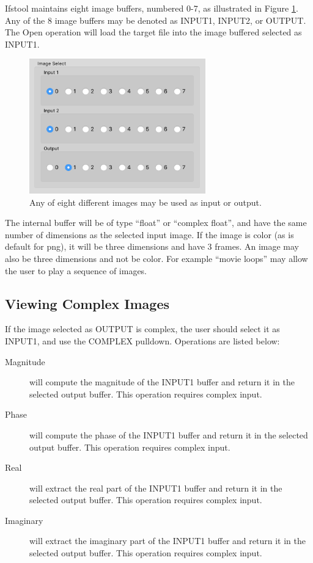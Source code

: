 \documentclass[11pt]{amsart}
\begin{document}
Ifstool maintains eight image buffers, numbered 0-7, as illustrated in Figure \ref{fig:InputSelect}. Any of the 8 image buffers may be denoted as INPUT1, INPUT2, or OUTPUT. The Open operation will load the target file into the image buffered selected as INPUT1.
\begin{figure}
\includegraphics[width=3in]{InputSelect.png}
\caption{Any of eight different images may be used as input or output.}
\label{fig:InputSelect}
\end{figure}

The internal buffer will be of type ``float'' or ``complex float'', and have the same number of dimensions as the selected input image. If the image is color (as is default for png), it will be three dimensions and have 3 frames. An image may also be three dimensions and not be color. For example ``movie loops'' may allow the user to play a sequence of images.



\subsection{Viewing Complex Images}
If the image selected as OUTPUT is complex, the user should select it as INPUT1, and use the COMPLEX pulldown. Operations are listed below:
\begin{description}
\item[Magnitude] will compute the magnitude of the INPUT1 buffer and return it in the selected output buffer. This operation requires complex input.
\item[Phase] will compute the phase of the INPUT1 buffer and return it in the selected output buffer. This operation requires complex input.
\item[Real] will extract the real part  of the INPUT1 buffer and return it in the selected output buffer. This operation requires complex input.
\item[Imaginary] will extract the imaginary part  of the INPUT1 buffer and return it in the selected output buffer. This operation requires complex input.
\end{description}
\end{document}
